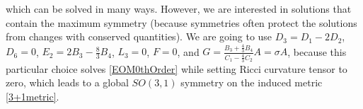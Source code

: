 \documentclass[twocolumn,
  showpacs,showkeys,prd,superscriptaddress]{revtex4-1}
\begin{document}
which can be solved in many ways.
However, we are interested in solutions that contain the maximum symmetry (because symmetries often protect the solutions from changes with conserved quantities). We are going to use  $D_3=D_1-2D_2$, $D_6=0$, $E_2=2 B_3 -\frac{8}{3} B_4$, $L_3=0$, $F=0$, and $G=\frac{B_3+\frac{4}{3}B_4}{C_1 - \frac{4}{3}C_2}A=\sigma A$, because this particular choice solves \eqref{EOM0thOrder} while setting Ricci curvature tensor to zero, which leads to a global $SO(3,1)$ symmetry on the induced metric \eqref{3+1metric}.



\end{document}
